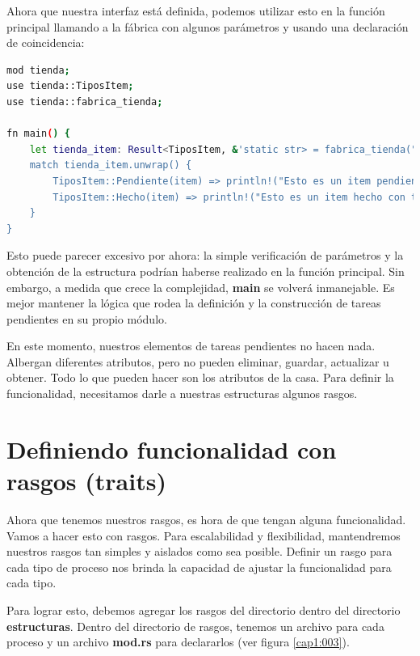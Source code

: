 Ahora que nuestra interfaz está definida, podemos utilizar esto en la función principal llamando a la fábrica con algunos parámetros y usando una declaración de coincidencia:

\begin{lstlisting}[language=bash]
mod tienda;
use tienda::TiposItem;
use tienda::fabrica_tienda;

fn main() {
	let tienda_item: Result<TiposItem, &'static str> = fabrica_tienda("pendiente", "hacer");
	match tienda_item.unwrap() {
		TiposItem::Pendiente(item) => println!("Esto es un item pendiente con titulo: {}", item.super_estructura.titulo),
		TiposItem::Hecho(item) => println!("Esto es un item hecho con titulo: {}", item.super_estructura.titulo)
	} 
}	
\end{lstlisting}

Esto puede parecer excesivo por ahora: la simple verificación de parámetros y la obtención de la estructura podrían haberse realizado en la función principal. Sin embargo, a medida que crece la complejidad, \textbf{main} se volverá inmanejable. Es mejor mantener la lógica que rodea la definición y la construcción de tareas pendientes en su propio módulo.

En este momento, nuestros elementos de tareas pendientes no hacen nada. Albergan diferentes atributos, pero no pueden eliminar, guardar, actualizar u obtener. Todo lo que pueden hacer son los atributos de la casa. Para definir la funcionalidad, necesitamos darle a nuestras estructuras algunos rasgos.

\section{Definiendo funcionalidad con rasgos (traits)}

Ahora que tenemos nuestros rasgos, es hora de que tengan alguna funcionalidad. Vamos a hacer esto con rasgos. Para escalabilidad y flexibilidad, mantendremos nuestros rasgos tan simples y aislados como sea posible. Definir un rasgo para cada tipo de proceso nos brinda la capacidad de ajustar la funcionalidad para cada tipo.

Para lograr esto, debemos agregar los rasgos del directorio dentro del directorio \textbf{estructuras}. Dentro del directorio de rasgos, tenemos un archivo para cada proceso y un archivo \textbf{mod.rs} para declararlos (ver figura \ref{cap1:003}).

